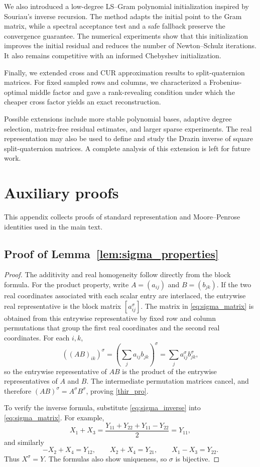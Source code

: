 \documentclass[12pt,a4paper]{article}
\theoremstyle{plain}
\theoremstyle{definition}
\theoremstyle{remark}
\begin{document}
We also introduced a low-degree LS--Gram polynomial initialization inspired by Souriau's inverse recursion. The method adapts the initial point to the Gram matrix, while a spectral acceptance test and a safe fallback preserve the convergence guarantee. The numerical experiments show that this initialization improves the initial residual and reduces the number of Newton--Schulz iterations. It also remains competitive with an informed Chebyshev initialization.

Finally, we extended cross and CUR approximation results to split-quaternion matrices. For fixed sampled rows and columns, we characterized a Frobenius-optimal middle factor and gave a rank-revealing condition under which the cheaper cross factor yields an exact reconstruction.

Possible extensions include more stable polynomial bases, adaptive degree selection, matrix-free residual estimates, and larger sparse experiments. The real representation may also be used to define and study the Drazin inverse of square split-quaternion matrices. A complete analysis of this extension is left for future work.


 



\appendix
\section{Auxiliary proofs}
\label{app:auxiliary-proofs}
This appendix collects proofs of standard representation and Moore--Penrose identities used in the main text.

\subsection{Proof of Lemma~\ref{lem:sigma_properties}}
\label{app:proof-sigma-properties}
\begin{proof}
The additivity and real homogeneity follow directly from the block formula. For the product property, write \(A=(a_{ij})\) and \(B=(b_{jk})\). If the two real coordinates associated with each scalar entry are interlaced, the entrywise real representative is the block matrix \([a_{ij}^\sigma]\). The matrix in \eqref{eq:sigma_matrix} is obtained from this entrywise representative by fixed row and column permutations that group the first real coordinates and the second real coordinates. For each \(i,k\),
\[
    ((AB)_{ik})^\sigma =\left(\sum_j a_{ij}b_{jk}\right)^\sigma =\sum_j a_{ij}^\sigma b_{jk}^\sigma,
\]
so the entrywise representative of \(AB\) is the product of the entrywise representatives of \(A\) and \(B\). The intermediate permutation matrices cancel, and therefore \((AB)^\sigma=A^\sigma B^\sigma\), proving \eqref{thir_pro}.

To verify the inverse formula, substitute \eqref{eq:sigma_inverse} into \eqref{eq:sigma_matrix}. For example,
\[
    X_1+X_3 =\frac{Y_{11}+Y_{22}+Y_{11}-Y_{22}}{2} =Y_{11},
\]
and similarly
\[
    -X_2+X_4=Y_{12},\qquad X_2+X_4=Y_{21},\qquad X_1-X_3=Y_{22}.
\]
Thus \(X^\sigma=Y\). The formulas also show uniqueness, so \(\sigma\) is bijective.
\end{proof}
\end{document}
